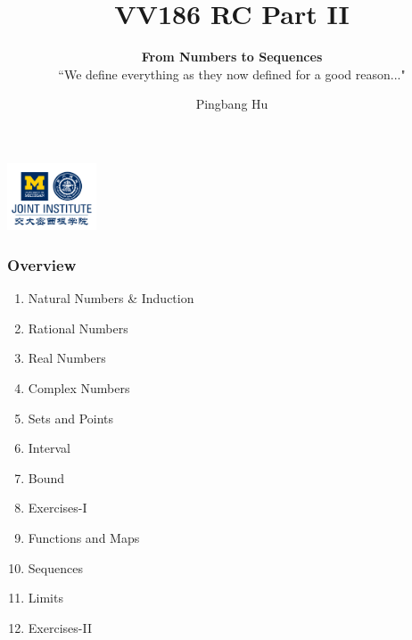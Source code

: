 \documentclass[12pt, t]{beamer}
\title{VV186 RC Part II}
\subtitle{\textbf{From Numbers to Sequences}\\``We define everything as they now defined for a good reason..."}
\institute[UM-SJTU JI]{University of Michigan-Shanghai Jiao Tong University Joint Institute}
\author{Pingbang Hu}
\begin{document}
\begin{frame}
    \titlepage
    \begin{center}
        \includegraphics[height=2cm]{Figures/logo/logo2.png}
    \end{center}
\end{frame}

\begin{frame}
    \frametitle{Overview}
    \begin{enumerate}
        \item Natural Numbers \& Induction
        \item Rational Numbers
        \item Real Numbers
        \item Complex Numbers
        \item Sets and Points
        \item Interval
        \item Bound
        \item Exercises-I
        \item Functions and Maps
        \item Sequences
        \item Limits
        \item Exercises-II
    \end{enumerate}
\end{frame}
\end{document}
